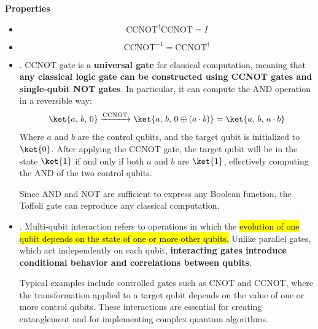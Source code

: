 \highspace
\begin{flushleft}
    \textcolor{Green3}{ \textbf{Properties}}
\end{flushleft}
\begin{itemize}
    \item {}
    \begin{equation*}
        \text{CCNOT}^\dagger \text{CCNOT} = I
    \end{equation*}
    
    
    \item {}
    \begin{equation*}
        \text{CCNOT}^{-1} = \text{CCNOT}^\dagger
    \end{equation*}
    

    \item {}. CCNOT gate is a \textbf{universal gate} for classical computation, meaning that \textbf{any classical logic gate can be constructed using CCNOT gates and single-qubit NOT gates}. In particular, it can compute the AND operation in a reversible way:
    \begin{equation*}
        \ket{a,\, b,\, 0} \xrightarrow{\text{CCNOT}} \ket{a,\, b,\, 0 \oplus \left(a \cdot b\right)} = \ket{a,\, b,\, a \cdot b}
    \end{equation*}
    Where $a$ and $b$ are the control qubits, and the target qubit is initialized to $\ket{0}$. After applying the CCNOT gate, the target qubit will be in the state $\ket{1}$ if and only if both $a$ and $b$ are $\ket{1}$, effectively computing the AND of the two control qubits.

    Since AND and NOT are sufficient to express any Boolean function, the Toffoli gate can reproduce any classical computation.
    

    \item {}. Multi-qubit interaction refers to operations in which the \hl{evolution of one qubit depends on the state of one or more other qubits.} Unlike parallel gates, which act independently on each qubit, \textbf{interacting gates introduce conditional behavior and correlations between qubits}.

    Typical examples include controlled gates such as CNOT and CCNOT, where the transformation applied to a target qubit depends on the value of one or more control qubits. These interactions are essential for creating entanglement and for implementing complex quantum algorithms.
    


\end{itemize}
